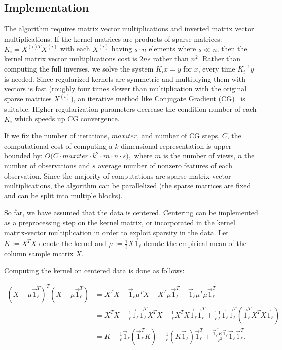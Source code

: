 \subsection{Implementation}\label{chap:extensions:implementation}
The algorithm requires matrix vector multiplications and inverted
matrix vector multiplications. If the kernel matrices are products of
sparse matrices: $K_i = X^{(i)T} X^{(i)}$ with each $X^{(i)}$ having
$s\cdot n$ elements
where $s \ll n$, then the kernel matrix vector multiplications cost is $2 n s$
rather than $n^2$. Rather than computing the full inverses, we solve
the system $K_i x = y$ for $x$, every time $K_i^{-1} y$ is needed. Since
regularized kernels are symmetric and multiplying them with vectors is
fast (roughly four times slower than multiplication with the original
sparse matrices $X^{(i)}$), an iterative method like Conjugate Gradient (CG)~\cite{golub} is
suitable. Higher regularization parameters decrease the condition
number of each $\tilde{K}_i$ which speeds up CG convergence.
\par
If we fix the number of iterations, $maxiter$, and number
of CG steps, $C$, the computational cost of computing a
$k$-dimensional representation is upper bounded by: $O\big(C \cdot
maxiter \cdot k^2 \cdot m \cdot n \cdot s \big),$ where $m$ is the
number of views, $n$ the number of observations and $s$ average number
of nonzero features of each observation.
Since the majority of computations are  sparse matrix-vector multiplications, the
algorithm can be parallelized (the sparse matrices are fixed and can be split into multiple
blocks).

So far, we have assumed that the data is centered. Centering can be implemented
as a preprocessing step on the kernel matrix, or incorporated in the kernel
matrix-vector multiplication in order to exploit sparsity in the data.
Let $K := X^T X$ denote the kernel and $\mu := \frac{1}{\ell} X \vec{1}_\ell$
denote the empirical mean of the column sample matrix $X$.

Computing the kernel on centered data is done as follows:

\begin{align}
 (X - \mu \vec{1}_\ell^T)^T (X - \mu \vec{1}_\ell^T)
 & = X^T X  - \vec{1}_\ell \mu^T X  - X^T \mu \vec{1}_\ell^T  +  \vec{1}_\ell \mu^T \mu \vec{1}_\ell^T  \nonumber \\
&  = X^T X - \frac{1}{\ell} \vec{1}_\ell \vec{1}_\ell^T X^T X  -  \frac{1}{\ell} X^T X \vec{1}_\ell \vec{1}_\ell^T
+ \frac{1}{\ell} \frac{1}{\ell} \vec{1}_\ell \vec{1}_\ell^T (\vec{1}_\ell^T X^T X \vec{1}_\ell) \nonumber \\
&  = K - \frac{1}{\ell} \vec{1}_\ell (\vec{1}_\ell^T K) - \frac{1}{\ell} (K \vec{1}_\ell)\vec{1}_\ell^T +
\frac{\vec{1}_\ell^T K \vec{1}_\ell}{\ell^2} \vec{1}_\ell \vec{1}_\ell^T. \nonumber
\end{align}

